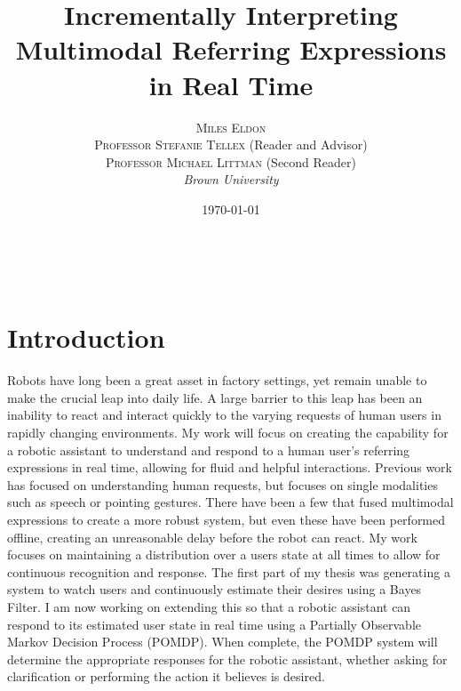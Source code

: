 \documentclass[a4paper, 11pt]{article} %
\title{\textbf{Incrementally Interpreting Multimodal Referring Expressions in Real Time}} %
\author{\textsc{Miles Eldon}\\ %
\textsc{Professor Stefanie Tellex} (Reader and Advisor)\\
{\textsc{Professor Michael Littman} (Second Reader)}
\\{\textit{Brown University}}} %
\date{\today} %
\makeatletter
\renewcommand{\maketitle}{ %
\begin{flushright} %
{\LARGE\@title} %

\vspace{50pt} %

{\large\@author} %
\\\@date %

\vspace{40pt} %
\end{flushright}
}
\makeatother
\begin{document}
\maketitle %



\section*{Introduction}
	Robots have long been a great asset in factory settings, yet remain unable to make the crucial leap into daily life. A large barrier to this leap has been an inability to react and interact quickly to the varying requests of human users in rapidly changing environments. My work will focus on creating the capability for a robotic assistant to understand and respond to a human user's referring expressions in real time, allowing for fluid and helpful interactions. Previous work has focused on understanding human requests, but focuses on single modalities such as speech or pointing gestures. There have been a few that fused multimodal expressions to create a more robust system, but even these have been performed offline, creating an unreasonable delay before the robot can react. My work focuses on maintaining a distribution over a users state at all times to allow for continuous recognition and response. The first part of my thesis was generating a system to watch users and continuously estimate their desires using a Bayes Filter. I am now working on extending this so that a robotic assistant can respond to its estimated user state in real time using a Partially Observable Markov Decision Process (POMDP). When complete, the POMDP system will determine the appropriate responses for the robotic assistant, whether asking for clarification or performing the action it believes is desired.
\end{document}
